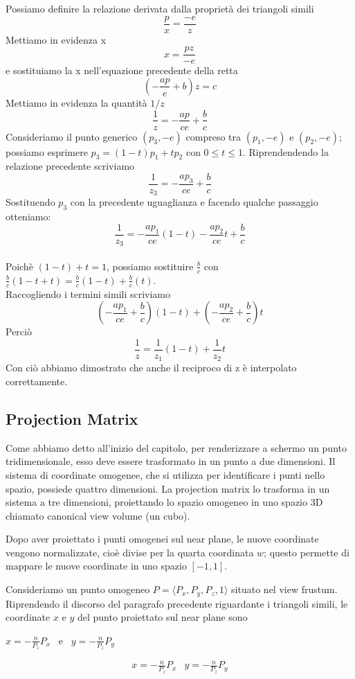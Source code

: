 Possiamo definire la relazione derivata dalla proprietà dei triangoli simili $$\frac{p}{x}=\frac{-e}{z}$$
Mettiamo in evidenza x $$x=\frac{pz}{-e}$$
e sostituiamo la x nell'equazione precedente della retta $$\left(-\frac{ap}{e}+b\right) z=c$$
Mettiamo in evidenza la quantità $1/z$ $$\frac{1}{z}=-\frac{ap}{ce}+\frac{b}{c}$$
Consideriamo il punto generico $(p_3,-e)$ compreso tra $(p_1,-e)$ e $(p_2,-e)$; possiamo esprimere $p_3=(1-t)p_1+tp_2$ con $0\leq t\leq 1$. 
Riprendendendo la relazione precedente scriviamo $$\frac{1}{z_3}=-\frac{ap_3}{ce}+\frac{b}{c}$$
Sostituendo $p_3$ con la precedente uguaglianza e facendo qualche passaggio otteniamo: $$\frac{1}{z_3}=-\frac{ap_1}{ce}(1-t)-\frac{ap_2}{ce}t+\frac{b}{c}$$\\
Poichè $(1-t)+t=1$, possiamo sostituire $\frac{b}{c}$ con $\frac{b}{c}(1-t+t)=\frac{b}{c}(1-t)+\frac{b}{c}(t)$.\\
Raccogliendo i termini simili scriviamo $$\left(-\frac{ap_1}{ce}+\frac{b}{c}\right)(1-t)+\left(-\frac{ap_2}{ce}+\frac{b}{c}\right)t$$
Perciò 
$$\frac{1}{z}=\frac{1}{z_1}(1-t)+\frac{1}{z_2}t$$
Con ciò abbiamo dimostrato che anche il reciproco di z è interpolato correttamente.\\

\subsection{Projection Matrix}
Come abbiamo detto all'inizio del capitolo, per renderizzare a schermo un punto tridimensionale, esso deve essere trasformato in un punto a due dimensioni. Il sistema di coordinate omogenee,  che si utilizza per identificare i punti nello spazio, possiede quattro dimensioni. La projection matrix lo trasforma in un sistema a tre dimensioni, proiettando lo spazio omogeneo in uno spazio 3D chiamato canonical view volume (un cubo).

Dopo aver proiettato i punti omogenei sul near plane, le nuove coordinate vengono normalizzate, cioè divise per la quarta coordinata $w$; questo permette di mappare le nuove coordinate in uno spazio $[-1,1]$.

Consideriamo un punto omogeneo $P=\langle P_x,P_y,P_z,1\rangle$ situato nel view frustum.
Riprendendo il discorso del paragrafo precedente riguardante i triangoli simili,  le coordinate $x$ e $y$ del punto proiettato sul near plane sono
\begin{center}
$x=-\frac{n}{P_z}{P_x}$ \,\,\,e\,\,\,  $y=-\frac{n}{P_z}{P_y}$
\end{center}
$$\begin{array}{cc}
x=-\frac{n}{P_z}{P_x} & y=-\frac{n}{P_z}{P_y}\\
\end{array}$$\\


